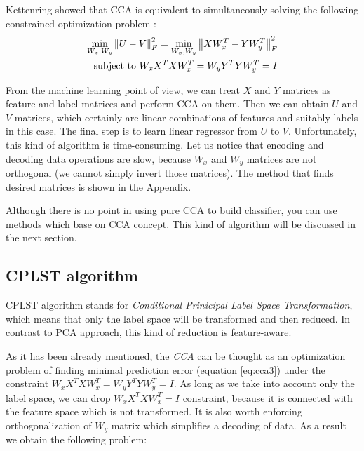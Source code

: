 Kettenring showed that CCA is equivalent to simultaneously solving the following constrained optimization problem \cite{ChenLin}:
\begin{equation}\label{eq:cca3}
\begin{split}
    \min_{W_x, W_y} \left\lVert U-V\right\rVert_{F}^2 = \min_{W_x, W_y} \left\lVert XW_x^T-YW_y^T\right\rVert_{F}^2 \\ 
    \text{   subject to   } W_xX^TXW_x^T=W_yY^TYW_y^T=I   
\end{split}
\end{equation}

From the machine learning point of view, we can treat $X$ and $Y$ matrices as feature and label matrices and perform CCA on them. Then we can obtain $U$ and $V$ matrices, which certainly are linear combinations of features and suitably labels in this case. The final step is to learn linear regressor from $U$ to $V$. Unfortunately, this kind of algorithm is time-consuming. Let us notice that encoding and decoding data operations are slow, because $W_x$ and $W_y$ matrices are not orthogonal (we cannot simply invert those matrices). The method that finds desired matrices is shown in the Appendix. 

Although there is no point in using pure CCA to build classifier, you can use methods which base on CCA concept. This kind of algorithm will be discussed in the next section.

\subsection{CPLST algorithm}

CPLST algorithm stands for \textit{Conditional Prinicipal Label Space Transformation}, which means that only the label space will be transformed and then reduced. In contrast to PCA approach, this kind of reduction is feature-aware. 

As it has been already mentioned, the \textit{CCA} can be thought as an optimization problem of finding minimal prediction error (equation \ref{eq:cca3}) under the constraint $W_xX^TXW_x^T=W_yY^TYW_y^T=I$. As long as we take into account only the label space, we can drop $W_xX^TXW_x^T=I$ constraint, because it is connected with the feature space which is not transformed. It is also worth enforcing orthogonalization of $W_y$ matrix which simplifies a decoding of data. As a result we obtain the following problem:


